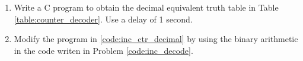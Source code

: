 \renewcommand{\theequation}{\theenumi}
\renewcommand{\thefigure}{\theenumi}
\begin{enumerate}[label=\thesection.\arabic*.,ref=\thesection.\theenumi]

\item  Write a C program to obtain  
the decimal equivalent truth table in Table \ref{table:counter_decoder}. Use a delay of 1 second.
\label{code:inc_ctr_decimal}

\item Modify the program in \ref{code:inc_ctr_decimal} by using the binary arithmetic in the 
code writen 
in Problem \ref{code:inc_decode}.



\end{enumerate}
